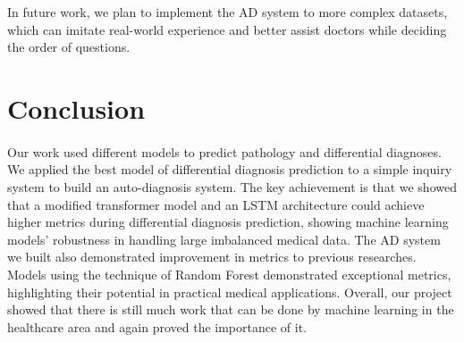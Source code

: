 \documentclass{article}
\begin{document}
In future work, we plan to implement the AD system to more complex datasets, which can imitate real-world experience and better assist doctors while deciding the order of questions. 

\section{Conclusion}
\paragraph{ }
Our work used different models to predict pathology and differential diagnoses. We applied the best model of differential diagnosis prediction to a simple inquiry system to build an auto-diagnosis system. The key achievement is that we showed that a modified transformer model and an LSTM architecture could achieve higher metrics during differential diagnosis prediction, showing machine learning models' robustness in handling large imbalanced medical data. The AD system we built also demonstrated improvement in metrics to previous researches. Models using the technique of Random Forest demonstrated exceptional metrics, highlighting their potential in practical medical applications. Overall, our project showed that there is still much work that can be done by machine learning in the healthcare area and again proved the importance of it.

\newpage
\printbibliography
\end{document}
